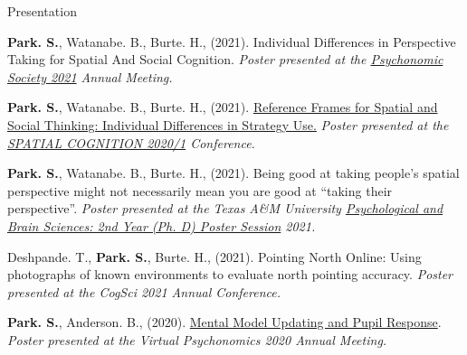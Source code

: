 \documentclass{resume} %
\begin{document}
\begin{rSection}{Presentation}
\begin{hangingpar}
	\end{hangingpar}
	
	\begin{hangingpar}
		
		\textbf{Park. S.}, Watanabe. B., Burte. H., (2021). 
		Individual Differences in Perspective Taking for Spatial And Social Cognition. 
		\em{Poster presented at the
			\href{https://www.psychonomic.org/page/2021annualmeeting}{Psychonomic Society 2021} Annual Meeting.}
		
	\end{hangingpar}
	
	\begin{hangingpar}
		
		\textbf{Park. S.}, Watanabe. B., Burte. H., (2021). 
		\href{https://sc2020.lu.lv/wp-content/uploads/2021/08/spatialCog21Poster_SungjoonParkV2.pdf}{Reference Frames for Spatial and Social Thinking: 
			Individual Differences in Strategy Use.} 
		\em{Poster presented at the 
			\href{http://sc2020.lu.lv/}{SPATIAL COGNITION 2020/1} Conference.}
		
	\end{hangingpar}
	
	\begin{hangingpar}
		
		\textbf{Park. S.}, Watanabe. B., Burte. H., (2021). 
		Being good at taking people's spatial perspective might not necessarily 
		mean you are good at “taking their perspective”. 
		\em{Poster presented at the Texas A\&M University
			\href{https://sites.google.com/tamu.edu/2021-2nd-year-poster/home}{Psychological
				and Brain Sciences: 2nd Year (Ph. D) Poster Session} 2021.}
		
	\end{hangingpar}
	
	\begin{hangingpar}
		
		Deshpande. T., \textbf{Park. S.}, Burte. H., (2021). 
		Pointing North Online: Using photographs of known environments to 
		evaluate north pointing accuracy. 
		\em{Poster presented at the CogSci 2021 Annual Conference.}
		
	\end{hangingpar}
	
	\begin{hangingpar}
		
		\textbf{Park. S.}, Anderson. B., (2020). \href{https://github.com/sjp117/Undergrad_Projects/blob/68a2d0fac79b4e8f553d6971f3444f6b2a2f3dfc/mentalModelUpdatingPupil/supplament/psynom20Poster.odp}
		{Mental Model Updating and Pupil Response}. 
		\em{Poster presented at the Virtual Psychonomics 2020 Annual Meeting.}
		
	\end{hangingpar}
	
\end{rSection}
\end{document}
